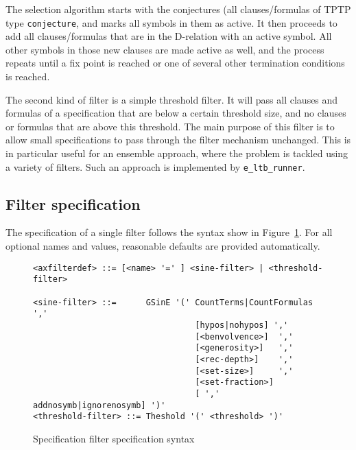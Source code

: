 \documentclass{report}
\begin{document}
The selection algorithm starts with the conjectures (all
clauses/formulas of TPTP type \texttt{conjecture}, and marks all
symbols in them as active. It then proceeds to add all
clauses/formulas that are in the D-relation with an active symbol. All
other symbols in those new clauses are made active as well, and the
process repeats until a fix point is reached or one of several other
termination conditions is reached.

The second kind of filter is a simple threshold filter. It will pass
all clauses and formulas of a specification that are below a certain
threshold size, and no clauses or formulas that are above this
threshold. The main purpose of this filter is to allow small
specifications to pass through the filter mechanism unchanged. This is
in particular useful for an ensemble approach, where the problem is
tackled using a variety of filters. Such an approach is implemented by
\texttt{e\_ltb\_runner}.


\subsection{Filter specification}

The specification of a single filter follows the syntax show in
Figure~\ref{fig:axfilter}. For all optional names and values,
reasonable defaults are provided automatically.

\begin{figure}
  \small
\begin{verbatim}
<axfilterdef> ::= [<name> '=' ] <sine-filter> | <threshold-filter>

<sine-filter> ::=      GSinE '(' CountTerms|CountFormulas ','
                                 [hypos|nohypos] ','
                                 [<benvolvence>]  ','
                                 [<generosity>]   ','
                                 [<rec-depth>]    ','
                                 [<set-size>]     ','
                                 [<set-fraction>]
                                 [ ',' addnosymb|ignorenosymb] ')'
<threshold-filter> ::= Theshold '(' <threshold> ')'
\end{verbatim}
  \caption{Specification filter specification syntax}
  \label{fig:axfilter}
\end{figure}
\end{document}

